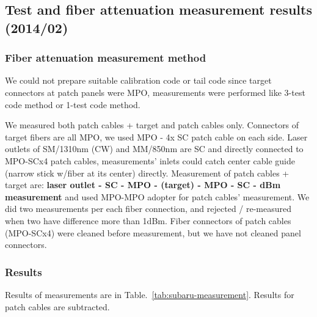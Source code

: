 \documentclass[a4paper,notitlepage]{article}
\begin{document}
\subsection{Test and fiber attenuation measurement results (2014/02)} 

\subsubsection{Fiber attenuation measurement method}

We could not prepare suitable calibration code or tail code since 
target connectors at patch panels were MPO, measurements were performed 
like 3-test code method or 1-test code method. 

We measured both patch cables + target and patch cables only. 
Connectors of target fibers are all MPO, we used MPO - 4x SC patch cable on 
each side. Laser outlets of SM/1310nm (CW) and MM/850nm are SC and directly 
connected to MPO-SCx4 patch cables, 
measurements' inlets could catch center cable guide (narrow stick w/fiber 
at its center) directly.
Measurement of patch cables + target are:
{\bf laser outlet - SC - MPO - (target) - MPO - SC - dBm measurement} 
and used MPO-MPO adopter for patch cables' measurement.
We did two measurements per each fiber connection, and rejected / re-measured 
when two have difference more than 1dBm. 
Fiber connectors of patch cables (MPO-SCx4) were cleaned before measurement, 
but we have not cleaned panel connectors. 

\subsubsection{Results}

Results of measurements are in Table.~\ref{tab:subaru-measurement}. 
Results for patch cables are subtracted. 
\end{document}
